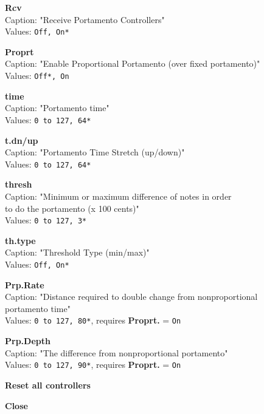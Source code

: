 \documentclass[
 11pt,
 twoside,
 a4paper,
 headinclude,
 footinclude,
 final                                 %
]{article}
\begin{document}
\begin{enumber}
\begin{enumber}
\begin{enumber}
\begin{enumber}
            \item \textbf{Rcv} \\
               Caption: "Receive Portamento Controllers" \\
               Values: \texttt{Off, On*}
            \item \textbf{Proprt} \\
               Caption: "Enable Proportional Portamento (over fixed portamento)" \\
               Values: \texttt{Off*, On}
            \item \textbf{time} \\
               Caption: "Portamento time" \\
               Values: \texttt{0 to 127, 64*}
            \item \textbf{t.dn/up} \\
               Caption: "Portamento Time Stretch (up/down)" \\
               Values: \texttt{0 to 127, 64*}
            \item \textbf{thresh} \\
               Caption: "Minimum or maximum difference of notes in order \\
                  to do the portamento (x 100 cents)" \\
               Values: \texttt{0 to 127, 3*}
            \item \textbf{th.type} \\
               Caption: "Threshold Type (min/max)" \\
               Values: \texttt{Off, On*}
            \item \textbf{Prp.Rate} \\
               Caption: "Distance required to double change from nonproportional \\
                  portamento time" \\
               Values: \texttt{0 to 127, 80*}, requires \textbf{Proprt.} =
               \texttt{On}
            \item \textbf{Prp.Depth} \\
               Caption: "The difference from nonproportional portamento" \\
               Values: \texttt{0 to 127, 90*}, requires \textbf{Proprt.} =
               \texttt{On}
         \end{enumber}
         \item \textbf{Reset all controllers}
         \item \textbf{Close}

\end{enumber}
\end{enumber}
\end{enumber}
\end{document}
